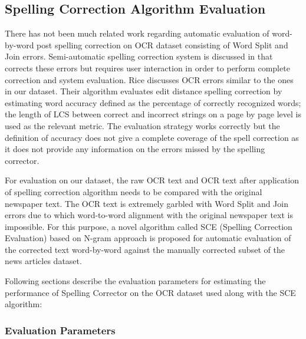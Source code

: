 \documentclass[letterpaper,11pt]{report}
\begin{document}
\subsection{Spelling Correction Algorithm Evaluation}


There has not been much related work regarding automatic evaluation of word-by-word post spelling correction on OCR dataset consisting of Word Split and Join errors. Semi-automatic spelling correction system is discussed in \cite{taghva2001ocrspell} that corrects these errors but requires user interaction in order to perform complete correction and system evaluation. Rice\cite{rice1996measuring} discusses OCR errors similar to the ones in our dataset. Their algorithm evaluates edit distance spelling correction by estimating word accuracy defined as the percentage of correctly recognized words; the length of LCS between correct and incorrect strings on a page by page level is used as the relevant metric. The evaluation strategy works correctly but the definition of accuracy does not give a complete coverage of the spell correction as it does not provide any information on the errors missed by the spelling corrector.

For evaluation on our dataset, the raw OCR text and OCR text after application of spelling correction algorithm needs to be compared with the original newspaper text. The OCR text is extremely garbled with Word Split and Join errors due to which word-to-word alignment with the original newspaper text is impossible. For this purpose, a novel algorithm called SCE (Spelling Correction Evaluation) based on N-gram approach is proposed for automatic evaluation of the corrected text word-by-word against the manually corrected subset of the news articles dataset. 

Following sections describe the evaluation parameters for estimating the performance of Spelling Corrector on the OCR dataset used along with the SCE algorithm:

\subsubsection{Evaluation Parameters}
\end{document}
